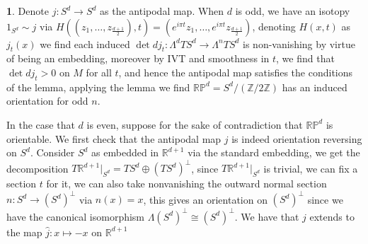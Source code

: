 \documentclass[10.5pt]{article}
\theoremstyle{definition}
\newtheorem{pb}{}
\begin{document}
\begin{pb}
        Denote \(j:S^d \to S^d\) as the antipodal map. When \(d\) is odd, we have an isotopy \(1_{S^d} \sim j\) via \(H((z_1,\hdots,z_{\frac{d+1}{2}}),t) = (e^{i\pi t}z_1,\hdots,e^{i\pi t}z_{\frac{d+1}{2}})\), denoting \(H(x,t)\) as \(j_t(x)\) we find each induced \(\det dj_t: \Lambda^d TS^d \to \Lambda^n TS^d\) is non-vanishing by virtue of being an embedding, moreover by IVT and smoothness in \(t\), we find that \(\det dj_t > 0\) on \(M\) for all \(t\), and hence the antipodal map satisfies the conditions of the lemma, applying the lemma we find \(\mathbb{RP}^d = S^d/(\mathbb{Z}/ 2 \mathbb{Z})\) has an induced orientation for odd \(n\).

        In the case that \(d\) is even, suppose for the sake of contradiction that \(\mathbb{RP}^d\) is orientable. We first check that the antipodal map \(j\) is indeed orientation reversing on \(S^d\). Consider \(S^d\) as embedded in \(\mathbb{R}^{d+1}\) via the standard embedding, we get the decomposition \(T \mathbb{R}^{d+1}\vert_{S^d} = TS^d \oplus (TS^d)^\perp\), since \(T \mathbb{R}^{d+1}\vert_{S^d}\) is trivial, we can fix a section \(t\) for it, we can also take nonvanishing the outward normal section \(n: S^d \to (S^d)^\perp\) via \(n(x) = x\), this gives an orientation on \((S^d)^\perp\) since we have the canonical isomorphism \(\Lambda (S^d)^\perp \cong (S^d)^\perp\). We have that \(j\) extends to the map \(\hat{j}: x \mapsto -x\) on \(\mathbb{R}^{d+1}\)
    \end{pb}
\end{document}
